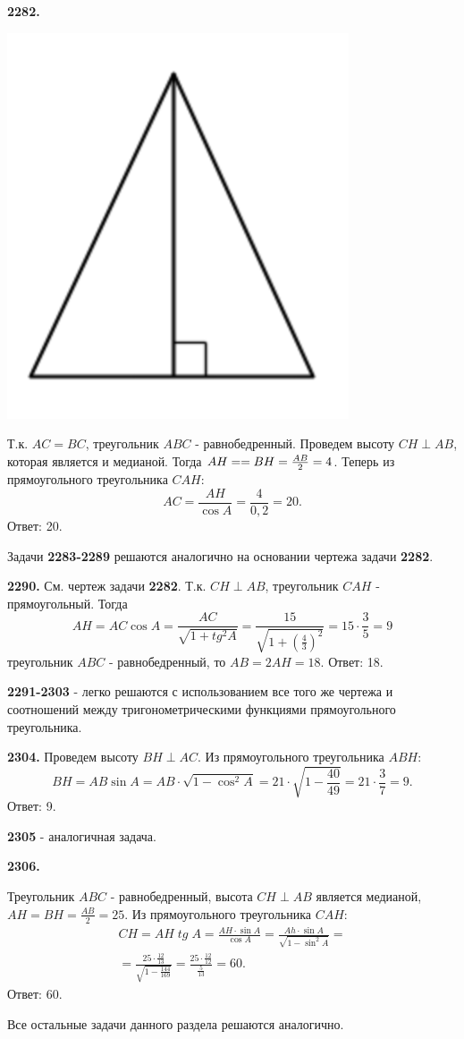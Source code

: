 \textbf{2282.}

{\centering \includegraphics[width=0.35\linewidth]{Geometry/Content/53.png}
	
}

Т.к. $AC=BC$,  треугольник $ABC$ - равнобедренный. Проведем высоту $CH \perp AB$, которая является и медианой. Тогда $AH=\linebreak=BH=\frac{AB}{2}=4$. Теперь из прямоугольного треугольника $CAH$:
\[
AC=\frac{AH}{\cos{A}}=\frac{4}{0,2}=20.
\] \null \hspace*{\fill} Ответ: 20.

 Задачи \textbf{2283-2289} решаются аналогично на основании чертежа задачи \textbf{2282}.
 
 \textbf{2290.} См. чертеж задачи \textbf{2282}. Т.к. $CH \perp AB$, треугольник $CAH$ - прямоугольный. Тогда
 \[
 AH=AC\cos{A} =\frac{AC}{\sqrt{1+tg^2A}}=\frac{15}{\sqrt{1+ \left( \frac{4}{3} \right)^2}}=15\cdot\frac{3}{5}=9
 \] 
 треугольник $ABC$ - равнобедренный, то $AB=2AH=18$. \newline \null \hspace*{\fill} Ответ: 18.
 
 \textbf{2291-2303} - легко решаются с использованием все того же чертежа и соотношений между тригонометрическими функциями прямоугольного треугольника.
 
 \textbf{2304.} Проведем высоту $BH\perp AC$. Из прямоугольного треугольника $ABH$:
 \[
 BH = AB\sin{A}=AB\cdot\sqrt{1-\cos^2{A}}=21\cdot\sqrt{1-\frac{40}{49}}=21\cdot\frac{3}{7}=9.
 \] \null \hspace*{\fill} Ответ: 9.
 
 \textbf{2305} - аналогичная задача.
 
 \textbf{2306.}
 
 Треугольник $ABC$ - равнобедренный, высота $CH \perp AB$ является медианой, $AH=BH=\frac{AB}{2}=25$. Из прямоугольного треугольника $CAH$:
 \begin{multline*}
 CH=AH\;tg\;A=\frac{AH\cdot\sin{A}}{\cos{A}}=\frac{Ah\cdot\sin{A}}{\sqrt{1-\sin^2{A}}}=\\=\frac{25\cdot \frac{12}{13}}{\sqrt{1-\frac{144}{169}}} =\frac{25\cdot\frac{12}{12}}{\frac{5}{13}} = 60.
 \end{multline*} \null \hspace*{\fill} Ответ: 60.

Все остальные задачи данного раздела решаются аналогично.